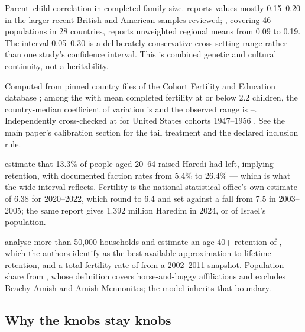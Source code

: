 \begin{description}[leftmargin=1.2em,style=nextline,itemsep=0.35em]
\item[mainstream persistence] Parent--child correlation in completed family size.
\citet{murphy1999} reports values mostly 0.15--0.20 in the larger recent British
and American samples reviewed; \citet{murphy2013}, covering 46 populations in 28
countries, reports unweighted regional means from 0.09 to 0.19. The interval
0.05--0.30 is a deliberately conservative cross-setting range rather than one
study's confidence interval. This is combined genetic and cultural continuity,
not a heritability.

\item[mainstream propensity cv] Computed from \CVAllCountries{} pinned country
files of the Cohort Fertility and Education database \citep{cfe2017}; among the
\CVCountries{} with mean completed fertility at or below 2.2 children, the
country-median coefficient of variation is \CVMedian{} and the observed range is
\CVMin{}--\CVMax{}. Independently cross-checked at \CVUnitedStates{} for United
States cohorts 1947--1956 \citep{cdccohort}. See the main paper's calibration section for the tail
treatment and the declared inclusion rule.

\item[group retention/fertility/share, haredi] \citet{regev2020} estimate that
13.3\% of people aged 20--64 raised Haredi had left, implying \HarediRetention{}
retention, with documented faction rates from 5.4\% to 26.4\% --- which is what
the wide interval reflects. Fertility \HarediFertility{} is the national
statistical office's own estimate of 6.38 for 2020--2022, which \citet{idi2024}
round to 6.4 and set against a fall from 7.5 in 2003--2005; the same report gives
1.392 million Haredim in 2024, or \HarediShare{} of Israel's population.

\item[group retention/fertility/share, amish] \citet{anderson2025} analyse more
than 50{,}000 households and estimate an age-40+ retention of \AmishRetention{},
which the authors identify as the best available approximation to lifetime
retention, and a total fertility rate of \AmishFertility{} from a 2002--2011
snapshot. Population share \AmishShare{} from \citet{youngcenter2024}, whose
definition covers horse-and-buggy affiliations and excludes Beachy Amish and
Amish Mennonites; the model inherits that boundary.
\end{description}

\subsection*{Why the knobs stay knobs}


